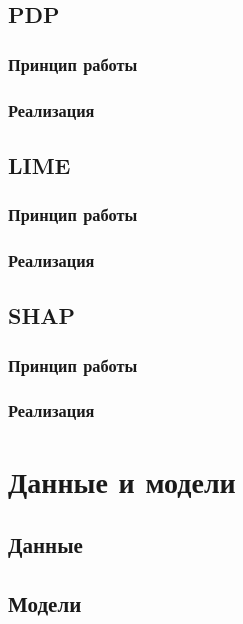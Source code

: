 \documentclass[a4paper, 12pt]{article}
\begin{document}
	\subsection{PDP}
	
	\subsubsection{Принцип работы}
	
	\subsubsection{Реализация}
	
	\subsection{LIME}
	
	\subsubsection{Принцип работы}
	
	\subsubsection{Реализация}
	
	\subsection{SHAP}
	
	\subsubsection{Принцип работы}
	
	\subsubsection{Реализация}
	
	\newpage

	\section{Данные и модели}
	
	\subsection{Данные}
	
	\subsection{Модели}
	
\end{document}
